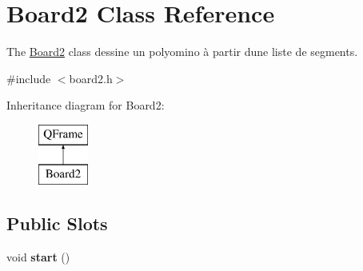 \hypertarget{class_board2}{}\section{Board2 Class Reference}
\label{class_board2}


The \hyperlink{class_board2}{Board2} class dessine un polyomino à partir d\textquotesingle{}une liste de segments.  




{\ttfamily \#include $<$board2.\+h$>$}

Inheritance diagram for Board2\+:\begin{figure}[H]
\begin{center}
\leavevmode
\includegraphics[height=2.000000cm]{class_board2}
\end{center}
\end{figure}
\subsection*{Public Slots}
\begin{DoxyCompactItemize}
\item 
void {\bfseries start} ()\hypertarget{class_board2_ab7dff7e5274b356a9e6fcf86504d83ff}{}\label{class_board2_ab7dff7e5274b356a9e6fcf86504d83ff}

\end{DoxyCompactItemize}
